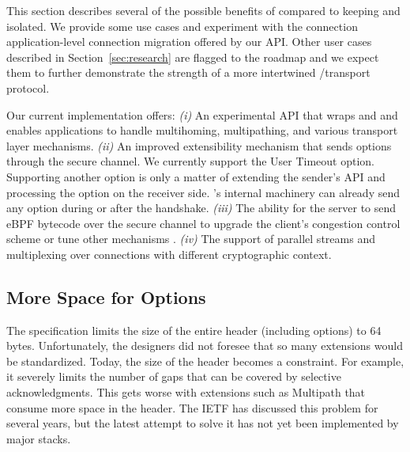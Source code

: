 \label{sec:content}

This section describes several of the possible benefits of \tcpls
compared to keeping \tcp and \tls isolated.
We provide some use cases and experiment with the
connection application-level connection migration offered by our API. Other user
cases described in Section~\ref{sec:research} are flagged to the roadmap and we
expect them to further demonstrate the
strength of a more intertwined \tls/\tcp transport protocol.

Our current implementation offers:
\textit{(i)} An experimental API that wraps \tls and \tcp and enables
    applications to
    handle multihoming, multipathing, and various transport layer mechanisms.
  \textit{(ii)} An improved \tcp extensibility mechanism that sends \tcp options
    through the secure \tcpls channel. We currently support the \tcp
    User Timeout option. Supporting another \tcp option is only a matter of
    extending the sender's API and processing the option
    on the receiver side. \tcpls's internal machinery can already send any \tcp
    option during or after the handshake.
\textit{(iii)} The ability for the server to send eBPF bytecode over the secure
  channel to upgrade the client's \tcp congestion control scheme or
  tune other \tcp mechanisms \cite{brakmo2017tcp, tran2019beyond}.
  \textit{(iv)} The support of parallel streams and multiplexing over \tcp connections
    with different cryptographic context.


\subsection{More Space for \tcp Options}
\label{sec:tcpoptions}

The \tcp specification limits the size of the entire \tcp header (including options)
to 64 bytes. Unfortunately, the \tcp designers did not foresee that so many \tcp
extensions would be standardized. Today, the size of the \tcp header
becomes a constraint. For example, it severely limits the number of gaps that
can be covered by selective acknowledgments. This gets worse with extensions
such as Multipath \tcp \cite{rfc6824} that consume more space in the \tcp header.
The IETF has discussed this problem for several years, but the latest attempt
to solve it \cite{draft-ietf-tcpm-tcp-edo-10} has not yet been implemented by
major \tcp stacks.

